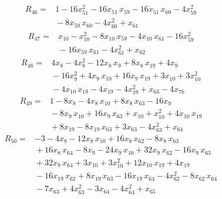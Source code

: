 \documentclass[11pt]{article}
\begin{document}
\begin{equation*}\begin{aligned}
R_{46}={}&1 - 16x_{51}^{2} - 16x_{51}\,x_{59} - 16x_{51}\,x_{60} - 4x_{59}^{2} \\
&{} - 8x_{59}\,x_{60} - 4x_{60}^{2} + x_{61}
\end{aligned}\end{equation*}
\begin{equation*}\begin{aligned}
R_{47}={}&x_{10} - x_{10}^{2} - 8x_{10}\,x_{59} - 4x_{10}\,x_{61} - 16x_{59}^{2} \\
&{} - 16x_{59}\,x_{61} - 4x_{61}^{2} + x_{62}
\end{aligned}\end{equation*}
\begin{equation*}\begin{aligned}
R_{48}={}&4x_{8} - 4x_{8}^{2} - 12x_{8}\,x_{9} + 8x_{8}\,x_{19} + 4x_{9} \\
&{} - 16x_{9}^{2} + 4x_{9}\,x_{10} + 16x_{9}\,x_{19} + 3x_{10} + 3x_{10}^{2} \\
&{} - 4x_{10}\,x_{19} - 4x_{19} - 4x_{19}^{2} + x_{63} - 4x_{76}
\end{aligned}\end{equation*}
\begin{equation*}\begin{aligned}
R_{49}={}&1 - 8x_{8} - 4x_{8}\,x_{10} + 8x_{8}\,x_{63} - 16x_{9} \\
&{} - 8x_{9}\,x_{10} + 16x_{9}\,x_{63} + x_{10} + x_{10}^{2} + 4x_{10}\,x_{19} \\
&{} + 8x_{19} - 8x_{19}\,x_{63} + 3x_{63} - 4x_{63}^{2} + x_{64}
\end{aligned}\end{equation*}
\begin{equation*}\begin{aligned}
R_{50}={}&-3 - 4x_{8} - 12x_{8}\,x_{10} + 16x_{8}\,x_{62} - 8x_{8}\,x_{63} \\
&{} + 16x_{8}\,x_{64} - 8x_{9} - 24x_{9}\,x_{10} + 32x_{9}\,x_{62} - 16x_{9}\,x_{63} \\
&{} + 32x_{9}\,x_{64} + 3x_{10} + 3x_{10}^{2} + 12x_{10}\,x_{19} + 4x_{19} \\
&{} - 16x_{19}\,x_{62} + 8x_{19}\,x_{63} - 16x_{19}\,x_{64} - 4x_{62}^{2} - 8x_{62}\,x_{64} \\
&{} - 7x_{63} + 4x_{63}^{2} - 3x_{64} - 4x_{64}^{2} + x_{65}
\end{aligned}\end{equation*}
\end{document}
